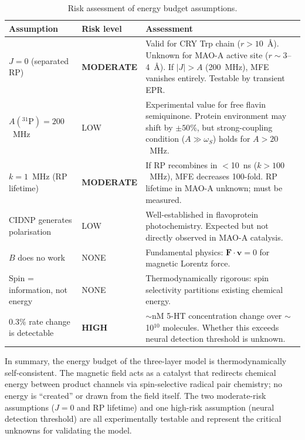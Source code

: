 \documentclass[11pt]{article}
\begin{document}
\begin{table}[h]
\centering
\caption{Risk assessment of energy budget assumptions.}
\label{tab:risk}
\small
\begin{tabular}{@{}llp{7cm}@{}}
\toprule
Assumption & Risk level & Assessment \\
\midrule
$J = 0$ (separated RP) & \textbf{MODERATE} & Valid for CRY Trp chain ($r > 10$~\AA). Unknown for MAO-A active site ($r \sim 3$--4~\AA). If $|J| > A$ (200~MHz), MFE vanishes entirely. Testable by transient EPR. \\
$A(^{31}\mathrm{P}) = 200$~MHz & LOW & Experimental value for free flavin semiquinone. Protein environment may shift by $\pm 50$\%, but strong-coupling condition ($A \gg \omega_S$) holds for $A > 20$~MHz. \\
$k = 1$~MHz (RP lifetime) & \textbf{MODERATE} & If RP recombines in $<$10~ns ($k > 100$~MHz), MFE decreases 100-fold. RP lifetime in MAO-A unknown; must be measured. \\
CIDNP generates polarisation & LOW & Well-established in flavoprotein photochemistry\cite{Tsentalovich2002}. Expected but not directly observed in MAO-A catalysis. \\
$B$ does no work & NONE & Fundamental physics: $\mathbf{F} \cdot \mathbf{v} = 0$ for magnetic Lorentz force\cite{Steiner1989}. \\
Spin = information, not energy & NONE & Thermodynamically rigorous: spin selectivity partitions existing chemical energy. \\
0.3\% rate change is detectable & \textbf{HIGH} & $\sim$nM 5-HT concentration change over $\sim$10$^{10}$ molecules. Whether this exceeds neural detection threshold is unknown. \\
\bottomrule
\end{tabular}
\end{table}

In summary, the energy budget of the three-layer model is thermodynamically self-consistent. The magnetic field acts as a catalyst that redirects chemical energy between product channels via spin-selective radical pair chemistry; no energy is ``created'' or drawn from the field itself. The two moderate-risk assumptions ($J = 0$ and RP lifetime) and one high-risk assumption (neural detection threshold) are all experimentally testable and represent the critical unknowns for validating the model.
\end{document}
